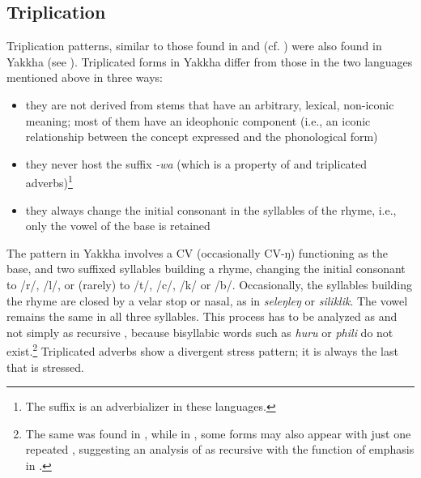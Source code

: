 \subsection{Triplication}\label{sec-trip}

Triplication patterns, similar to those found in  and  (cf. \citealt{Rai1984A-descriptive, Raietal1997Triplicated, Raietal2005Triplication}) were also found in Yakkha (see ). Triplicated forms in Yakkha differ from those in the two  languages mentioned above in three ways: 

\begin{itemize}
\item  they are not derived from stems that have an arbitrary, lexical, non-iconic meaning; most of them have an ideophonic component (i.e., an iconic relationship between the concept expressed and the phonological form)
\item  they never host the suffix \emph{-wa} (which is a property of  and  triplicated adverbs)\footnote{The suffix is an adverbializer in these languages.}
\item they always change the initial consonant in the syllables of the rhyme, i.e., only the vowel of the base is retained
\end{itemize}


The  pattern in Yakkha involves a  CV (occasionally CV-ŋ) functioning as the base, and two suffixed syllables building a rhyme, changing the initial consonant to /r/, /l/, or (rarely) to /t/, /c/, /k/ or /b/. Occasionally, the syllables building the rhyme are closed by a velar stop or nasal, as in \emph{seleŋleŋ} or \emph{siliklik}. The vowel remains the same in all three syllables. This process has to be analyzed as  and not simply as recursive , because bisyllabic words such as \emph{huru} or \emph{phili} do not exist.\footnote{The same was found in  \citep{Raietal2005Triplication}, while in  , some forms may also appear with just one repeated , suggesting an analysis of  as recursive  with the function of emphasis in  \citep[304]{Doornenbal2009A-grammar}.} Triplicated adverbs show a divergent stress pattern; it is always the last  that is stressed.


